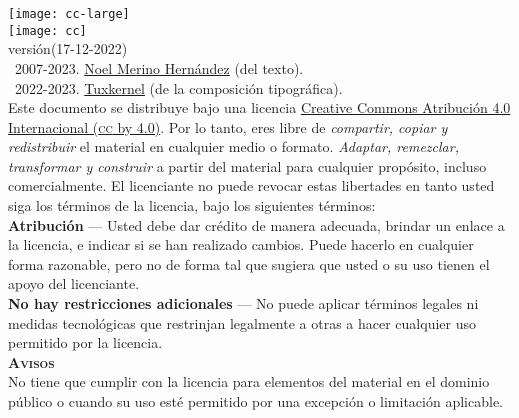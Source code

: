 \documentclass[14pt,twoside,final]{extbook} %
\begin{document}
\clearpage
\newpage
\pagestyle{empty}
\vspace*{0pt}
\vfill
\begin{scriptsize}
\begin{flushleft}
\begin{minipage}{7.5cm}
\texttt{[image: cc-large]}\label{fig:cc-large} \\

\texttt{[image: cc]}\label{fig:cc} \\

\def\fileversion{1.018}
\def\filedate{(17-12-2022)}
versión\space\fileversion\space\filedate \\

\textcopyright\ 2007-2023. \href{noel_merino@yahoo.com.mx}{Noel Merino Hernández} (del texto). \\ \textcopyright\ 2022-2023. \href{muxkernel@gmail.com}{Tuxkernel} (de la composición tipográfica). \\

\noindent Este documento se distribuye bajo una licencia \href{https://creativecommons.org/licenses/by/4.0/deed.es}{Creative Commons Atribución 4.0 Internacional (\textsc{cc} by 4.0)}. Por lo tanto, eres libre de \emph{compartir, copiar y redistribuir} el material en cualquier medio o formato. \emph{Adaptar, remezclar, transformar y construir} a partir del material para cualquier propósito, incluso comercialmente. El licenciante no puede revocar estas libertades en tanto usted siga los términos de la licencia, bajo los siguientes términos: \\

\noindent \textbf{Atribución} --- Usted debe dar crédito de manera adecuada, brindar un enlace a la licencia, e indicar si se han realizado cambios. Puede hacerlo en cualquier forma razonable, pero no de forma tal que sugiera que usted o su uso tienen el apoyo del licenciante. \\

\noindent \textbf{No hay restricciones adicionales} --- No puede aplicar términos legales ni medidas tecnológicas que restrinjan legalmente a otras a hacer cualquier uso permitido por la licencia. \\

\noindent \textbf{\textsc{Avisos}} \\

\noindent No tiene que cumplir con la licencia para elementos del material en el dominio público o cuando su uso esté permitido por una excepción o limitación aplicable. \\


\end{minipage}
\end{flushleft}
\end{scriptsize}
\end{document}
